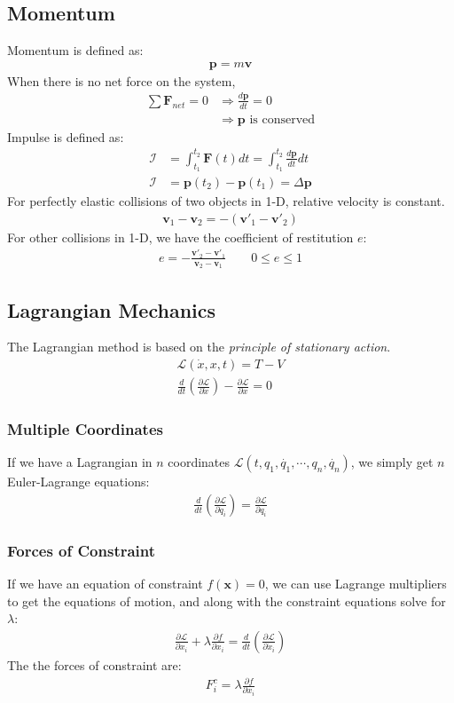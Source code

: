 \documentclass[11pt, letterpaper]{article}
\newcommand{\Lagr}{\mathcal{L}}	       %
\newcommand{\Imp}{\mathcal{I}}	       %
\newcommand{\ve}[1]{
  \ensuremath{\bm{#1}}}	               %
\newcommand{\pd}[2]{
  \ensuremath{
    \frac{\partial #1}{\partial #2} }} %
\begin{document}
\begin{multicols*}{3}
\subsection{Momentum}
Momentum is defined as:
\begin{align*}
  \ve{p} = m \ve{v}
\end{align*}
When there is no net force on the system,
\begin{align*}
  \sum \ve{F}_{net} = 0 &\Rightarrow \frac{d\ve{p}}{dt} = 0 \\
  &\Rightarrow \ve{p} \text{ is conserved}
\end{align*}
Impulse is defined as:
\begin{align*}
  \Imp &= \int_{t_1}^{t_2} \ve{F}(t) dt = \int_{t_1}^{t_2} \frac{d\ve{p}}{dt} dt \\
  \Imp &= \ve{p}(t_2) - \ve{p}(t_1) = \Delta \ve{p}
\end{align*}
For perfectly elastic collisions of two objects in 1-D, relative velocity is
constant.
\begin{align*}
  \ve{v}_1 - \ve{v}_2 = - (\ve{v}'_1 - \ve{v}'_2)
\end{align*}
For other collisions in 1-D, we have the coefficient of restitution $e$:
\begin{align*}
  e = -\frac{\ve{v}'_2 - \ve{v}'_1}{\ve{v}_2 - \ve{v}_1} \qquad 0 \leq e \leq 1
\end{align*}
\subsection{Lagrangian Mechanics}
The Lagrangian method is based on the \emph{principle of stationary action}.
\begin{align*}
  \Lagr(\dot{x},x,t) = T - V \\
  \frac{d}{dt}\left( \pd{\Lagr}{\dot{x}} \right) - \pd{\Lagr}{x} = 0
\end{align*}
\subsubsection{Multiple Coordinates}
If we have a Lagrangian in $n$ coordinates $\Lagr(t, q_1, \dot{q_1}, \cdots,
q_n, \dot{q_n})$, we simply get $n$ Euler-Lagrange equations:
\begin{align*}
  \frac{d}{dt}\left( \pd{\Lagr}{\dot{q}_i} \right) = \pd{\Lagr}{q_i}
\end{align*}
\subsubsection{Forces of Constraint}
If we have an equation of constraint $f(\ve{x}) = 0$, we can use Lagrange
multipliers to get the equations of motion, and along with the constraint
equations solve for $\lambda$:
\begin{align*}
  \pd{\Lagr}{x_i} + \lambda \pd{f}{x_i} = \frac{d}{dt} \left(
    \pd{\Lagr}{\dot{x}_i} \right)
\end{align*}
The the forces of constraint are:
\begin{align*}
  F_i^c = \lambda \pd{f}{x_i}
\end{align*}

\end{multicols*}
\end{document}
